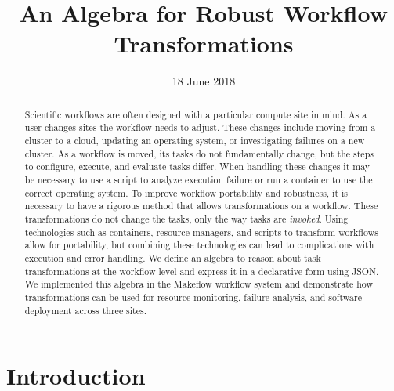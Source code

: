 \documentclass[conference]{IEEEtran}
\begin{document}
\title{An Algebra for Robust Workflow Transformations}



\author{
\and
{}
}

\date{18 June 2018}


\maketitle

\begin{abstract}
Scientific workflows 
are often designed with a
particular compute site in mind.
As a user changes sites
the workflow needs to adjust.
These changes include 
moving from a cluster to a cloud,
updating an operating system,
or investigating failures on a new cluster.
As a workflow is moved, 
its tasks do not fundamentally change,
but the steps to configure, 
execute, and evaluate tasks differ.
When handling these changes it may be necessary
to use a script to analyze execution failure or
run a container to use the correct operating system.
To improve workflow portability and robustness,
it is necessary to have
a rigorous method that allows transformations on a workflow.
These transformations do not change the tasks, 
only the way tasks are \emph{invoked}.
Using technologies such as containers, resource managers, and scripts 
to transform workflows allow for portability,
but combining these technologies
can lead to complications with execution and error
handling.
We define an algebra to reason about task transformations 
at the workflow level and express it
in a declarative form using JSON.
We implemented this algebra in the
Makeflow workflow system and demonstrate
how transformations can be used for 
resource monitoring, failure analysis, and software deployment across three sites.
\end{abstract}



\section{Introduction}
\end{document}
